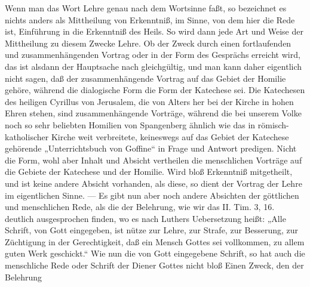 Wenn man das Wort Lehre genau nach dem Wortsinne faßt, so bezeichnet es nichts anders als Mittheilung von Erkenntniß, im Sinne, von dem hier die Rede ist, Einführung in die Erkenntniß des Heils. So wird dann jede Art und
Weise der Mittheilung zu diesem Zwecke Lehre. Ob der Zweck durch einen fortlaufenden und zusammenhängenden Vortrag oder in der Form des Gesprächs erreicht wird, das ist alsdann der Hauptsache nach gleichgültig, und man kann daher eigentlich nicht sagen, daß der zusammenhängende Vortrag auf das Gebiet der Homilie gehöre, während die dialogische Form die Form der Katechese sei. Die Katechesen des heiligen Cyrillus von Jerusalem, die von Alters her bei der Kirche in hohen Ehren stehen, sind zusammenhängende Vorträge, während die bei unserem Volke noch so sehr beliebten Homilien von Spangenberg ähnlich wie das in römisch-katholischer Kirche weit verbreitete, keineswegs auf das Gebiet der Katechese gehörende „Unterrichtsbuch von Goffine“ in Frage und Antwort predigen. Nicht die Form, wohl aber Inhalt und Absicht vertheilen die menschlichen Vorträge auf die Gebiete der Katechese und der Homilie. Wird bloß Erkenntniß mitgetheilt, und ist keine andere Absicht vorhanden, als diese, so dient der Vortrag der Lehre im eigentlichen Sinne. — Es gibt nun aber noch andere Absichten der göttlichen und menschlichen Rede, als die der Belehrung, wie wir das II. Tim. 3, 16. deutlich ausgesprochen finden, wo es nach Luthers Uebersetzung heißt: „Alle Schrift, von Gott eingegeben, ist nütze zur Lehre, zur Strafe, zur Besserung, zur Züchtigung in der Gerechtigkeit, daß ein Mensch Gottes sei vollkommen, zu allem guten Werk geschickt.“ Wie nun die von Gott eingegebene Schrift, so hat auch die menschliche Rede oder Schrift der Diener Gottes nicht bloß Einen Zweck, den der Belehrung%
